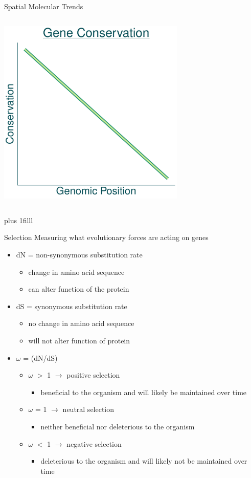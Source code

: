 \documentclass{beamer}
\makeatletter
\newcommand{\bi}{\begin{itemize}}
\newcommand{\ei}{\end{itemize}}
\newcommand{\sourceright}[1]{\begin{textblock*}{}
		\begin{beamercolorbox}[ht=0.5cm,left]{framesource}
			\usebeamerfont{framesource}\usebeamercolor[berry]{framesource}
			{#1}
		\end{beamercolorbox}
	\end{textblock*}}
\newcommand{\itm}{\item<itm@1->}
\newcommand{\btVFill}{\vskip0pt plus 1filll}
\makeatother
\begin{document}
\begin{frame}{Spatial Molecular Trends}
\begin{columns}[t]
		\includegraphics[width=0.67\textwidth]{./presentation_graphs/cons_graph.pdf}
	\end{columns}
	
	\btVFill
	\tiny \vspace{-\baselineskip}\color{berry}{Couturier et al. 2006, Cooper et al. 2010, Sharp et al. 2005, Morrow et al. 2012, Cooper and Rocha 2006}
	
\end{frame}
\begin{frame}{Selection}
	Measuring what evolutionary forces are acting on genes
	\bi
	\itm dN = non-synonymous substitution rate
		\bi
		\itm change in amino acid sequence
		\itm can alter function of the protein
		\ei
	\itm dS = synonymous substitution rate
		\bi
		\itm no change in amino acid sequence
		\itm will not alter function of protein
		\ei
	\itm $\omega$ = (dN/dS)
		\bi
		\itm $\omega$ $>$ 1 $\rightarrow$ positive selection
			\bi
			\itm beneficial to the organism and will likely be maintained over time
			\ei
		\itm $\omega$ = 1 $\rightarrow$ neutral selection
			\bi
			\itm neither beneficial nor deleterious to the organism
			\ei
		\itm $\omega$ $<$ 1 $\rightarrow$ negative selection
			\bi
			\itm deleterious to the organism and will likely not be maintained over time
			\ei
		\ei
	\ei
\end{frame}
\end{document}
